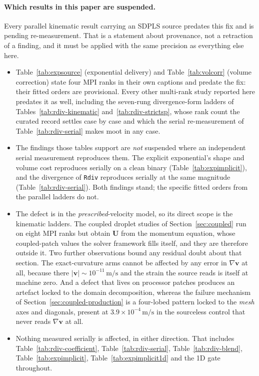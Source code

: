 \documentclass[preprint,3p,11pt]{elsarticle}
\begin{document}
\paragraph{Which results in this paper are suspended.} Every parallel kinematic
result carrying an SDPLS source predates this fix and is pending re-measurement.
That is a statement about provenance, not a retraction of a finding, and it must
be applied with the same precision as everything else here.
\begin{itemize}
  \item Table~\ref{tab:expsource} (exponential delivery) and
    Table~\ref{tab:volcorr} (volume correction) state four MPI ranks in their own
    captions and predate the fix: their fitted orders are provisional. Every other
    multi-rank study reported here predates it as well, including the seven-rung
    divergence-form ladders of Tables~\ref{tab:rdiv-kinematic}
    and~\ref{tab:rdiv-strictsp}, whose rank count the curated record settles case
    by case and which the serial re-measurement of Table~\ref{tab:rdiv-serial}
    makes moot in any case.
  \item The findings those tables support are \emph{not} suspended where an
    independent serial measurement reproduces them. The explicit exponential's
    shape and volume cost reproduces serially on a clean binary
    (Table~\ref{tab:expimplicit}), and the divergence of \texttt{Rdiv} reproduces
    serially at the same magnitude (Table~\ref{tab:rdiv-serial}). Both findings
    stand; the specific fitted orders from the parallel ladders do not.
  \item The defect is in the \emph{prescribed}-velocity model, so its direct scope
    is the kinematic ladders. The coupled droplet studies of
    Section~\ref{sec:coupled} run on eight MPI ranks but obtain $\mathbf{U}$ from
    the momentum equation, whose coupled-patch values the solver framework fills
    itself, and they are therefore outside it. Two further observations bound any
    residual doubt about that section. The exact-curvature arms cannot be affected
    by any error in $\nabla\mathbf{v}$ at all, because there
    $|\mathbf{v}| \sim 10^{-11}\,\mathrm{m/s}$ and the strain the source reads is
    itself at machine zero. And a defect that lives on processor patches produces
    an artefact locked to the domain decomposition, whereas the failure mechanism
    of Section~\ref{sec:coupled-production} is a four-lobed pattern locked to the
    \emph{mesh} axes and diagonals, present at
    $3.9\times10^{-4}\,\mathrm{m/s}$ in the sourceless control that never reads
    $\nabla\mathbf{v}$ at all.
  \item Nothing measured serially is affected, in either direction. That includes
    Table~\ref{tab:rdiv-coefficient}, Table~\ref{tab:rdiv-serial},
    Table~\ref{tab:rdiv-blend}, Table~\ref{tab:expimplicit},
    Table~\ref{tab:expimplicit1d} and the 1D gate throughout.
\end{itemize}
\end{document}
